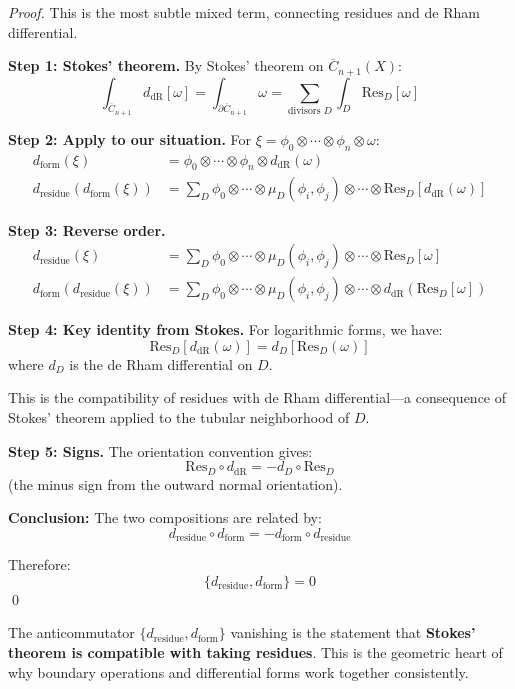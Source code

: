 \begin{proof}
This is the most subtle mixed term, connecting residues and de Rham differential.

\textbf{Step 1: Stokes' theorem.}
By Stokes' theorem on $\overline{C}_{n+1}(X)$:
$$\int_{\overline{C}_{n+1}} d_{\text{dR}}[\omega] = \int_{\partial\overline{C}_{n+1}} \omega
= \sum_{\text{divisors } D} \int_D \text{Res}_D[\omega]$$

\textbf{Step 2: Apply to our situation.}
For $\xi = \phi_0 \otimes \cdots \otimes \phi_n \otimes \omega$:
\begin{align*}
d_{\text{form}}(\xi) &= \phi_0 \otimes \cdots \otimes \phi_n \otimes d_{\text{dR}}(\omega)\\
d_{\text{residue}}(d_{\text{form}}(\xi)) &= \sum_{D} \phi_0 \otimes \cdots \otimes 
\mu_D(\phi_i, \phi_j) \otimes \cdots \otimes \text{Res}_D[d_{\text{dR}}(\omega)]
\end{align*}

\textbf{Step 3: Reverse order.}
\begin{align*}
d_{\text{residue}}(\xi) &= \sum_D \phi_0 \otimes \cdots \otimes \mu_D(\phi_i, \phi_j) 
\otimes \cdots \otimes \text{Res}_D[\omega]\\
d_{\text{form}}(d_{\text{residue}}(\xi)) &= \sum_D \phi_0 \otimes \cdots \otimes 
\mu_D(\phi_i, \phi_j) \otimes \cdots \otimes d_{\text{dR}}(\text{Res}_D[\omega])
\end{align*}

\textbf{Step 4: Key identity from Stokes.}
For logarithmic forms, we have:
$$\text{Res}_D[d_{\text{dR}}(\omega)] = d_{D}[\text{Res}_D(\omega)]$$
where $d_D$ is the de Rham differential on $D$.

This is the compatibility of residues with de Rham differential---a consequence of Stokes'
theorem applied to the tubular neighborhood of $D$.

\textbf{Step 5: Signs.}
The orientation convention gives:
$$\text{Res}_D \circ d_{\text{dR}} = -d_D \circ \text{Res}_D$$
(the minus sign from the outward normal orientation).

\textbf{Conclusion:} The two compositions are related by:
$$d_{\text{residue}} \circ d_{\text{form}} = -d_{\text{form}} \circ d_{\text{residue}}$$

Therefore:
$$\{d_{\text{residue}}, d_{\text{form}}\} = 0$$
\qed
\end{proof}

\begin{remark}
The anticommutator $\{d_{\text{residue}}, d_{\text{form}}\}$ vanishing is the statement
that \textbf{Stokes' theorem is compatible with taking residues}. This is the geometric
heart of why boundary operations and differential forms work together consistently.
\end{remark}

